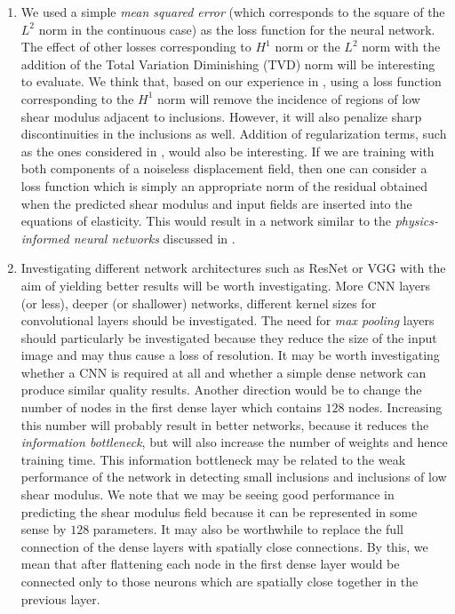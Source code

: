 \documentclass[12pt]{article}
\begin{document}
\begin{enumerate}
\item{We used a simple \textit{mean squared error} (which corresponds to the square of the $L^2$ norm in the continuous case) as the loss function for the neural network. The effect of other losses corresponding to $H^1$ norm or the $L^2$ norm with the addition of the Total Variation Diminishing (TVD) norm will be interesting to evaluate. We think that, based on our experience in \cite{diss:gokhale2007}, using a loss function corresponding to the $H^1$ norm will remove the incidence of regions of low shear modulus adjacent to inclusions. However, it will also penalize sharp discontinuities in the inclusions as well. Addition of regularization terms, such as the ones considered in \cite{diss:gokhale2007}, would also be interesting. If we are training with both components of a noiseless displacement field, then one can consider a loss function which is simply an appropriate norm of the  residual obtained when the predicted shear modulus and input fields are inserted into the equations of elasticity. This would result in a network similar to the \textit{physics-informed neural networks} discussed in \cite{paper:pinnkarniadakis}.}
\item{Investigating different network architectures such as ResNet \cite{conf:resnet} or VGG \cite{conf:vgg} with the aim of yielding better results will be worth investigating. More CNN layers (or less), deeper (or shallower) networks, different kernel sizes for convolutional layers should be investigated. The need for \textit{max pooling} layers should particularly be investigated because they reduce the size of the input image and may thus cause a loss of resolution. It may be worth investigating whether a CNN is required at all and whether a simple dense network can produce similar quality results. Another direction would be to change the number of nodes in the first dense layer which contains $128$ nodes. Increasing this number will probably result in better networks, because it reduces the \textit{information bottleneck}\cite{book:chollet}, but will also increase the number of weights and hence training time. This information bottleneck may be related to the weak performance of the network in detecting small inclusions and inclusions of low shear modulus. We note that we may be seeing good performance in predicting the shear modulus field because it can be represented in some sense by $128$ parameters. It may also be worthwhile to replace the full connection of the dense layers with spatially close connections. By this, we mean that after flattening each node in the first dense layer would be connected only to those neurons which are spatially close together in the previous layer.}

\end{enumerate}
\end{document}
